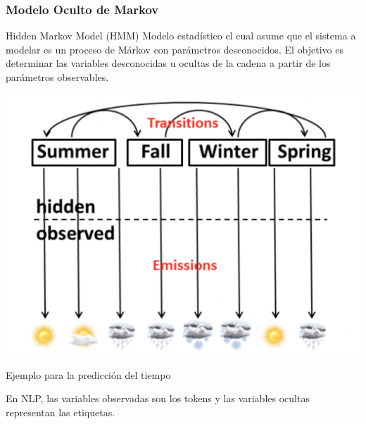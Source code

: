 \documentclass[
10pt, %
aspectratio=169, %
]{beamer}
\begin{document}
	
	\begin{frame}
		
		\frametitle{Modelo Oculto de Markov}
		
		\begin{alertblock}{Hidden Markov Model (HMM)}
			Modelo estadístico el cual asume que el sistema a modelar es un proceso de Márkov con parámetros desconocidos. El objetivo es determinar las variables desconocidas u ocultas de la cadena a partir de los parámetros observables. 
		\end{alertblock}
		
		\pause
		\noindent\begin{minipage}{.4\textwidth}
			\centering	
			\includegraphics[scale=0.38]{cadena-oculta-markov.png} 
		\end{minipage}%
		\begin{minipage}{.55\textwidth}
			
			\begin{adjustwidth}{1.5cm}{} 
				
				Ejemplo para la predicción del tiempo 
				
				
				\pause
				\vspace{2\baselineskip}
				En NLP, las variables observadas son los tokens y las variables ocultas representan las etiquetas.
			\end{adjustwidth}
		\end{minipage}
		
	\end{frame}
	
\end{document}
